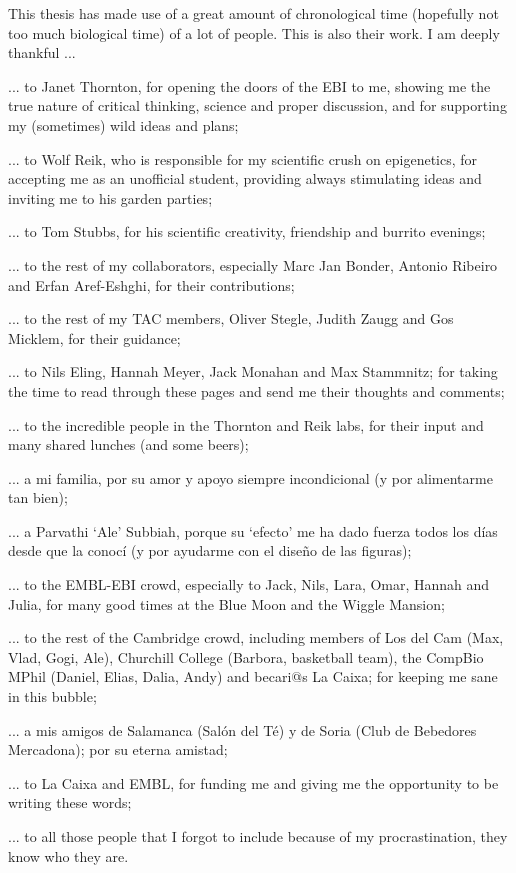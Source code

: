 
\begin{acknowledgements}      

\small
This thesis has made use of a great amount of chronological time (hopefully not too much biological time) of a lot of people. This is also their work. I am deeply thankful ...

\smallskip

... to Janet Thornton, for opening the doors of the EBI to me, showing me the true nature of critical thinking, science and proper discussion, and for supporting my (sometimes) wild ideas and plans;  

... to Wolf Reik, who is responsible for my scientific crush on epigenetics, for accepting me as an unofficial student, providing always stimulating ideas and inviting me to his garden parties;

... to Tom Stubbs, for his scientific creativity, friendship and burrito evenings;

... to the rest of my collaborators, especially Marc Jan Bonder, Antonio Ribeiro and Erfan Aref-Eshghi, for their contributions;

... to the rest of my TAC members, Oliver Stegle, Judith Zaugg and Gos Micklem, for their guidance;

... to Nils Eling, Hannah Meyer, Jack Monahan and Max Stammnitz; for taking the time to read through these pages and send me their thoughts and comments;

... to the incredible people in the Thornton and Reik labs, for their input and many shared lunches (and some beers);

... a mi familia, por su amor y apoyo siempre incondicional (y por alimentarme tan bien);

... a Parvathi `Ale' Subbiah, porque su `efecto' me ha dado fuerza todos los días desde que la conocí (y por ayudarme con el diseño de las figuras);

... to the EMBL-EBI crowd, especially to Jack, Nils, Lara, Omar, Hannah and Julia, for many good times at the Blue Moon and the Wiggle Mansion;

... to the rest of the Cambridge crowd, including members of Los del Cam (Max, Vlad, Gogi, Ale), Churchill College (Barbora, basketball team), the CompBio MPhil (Daniel, Elias, Dalia, Andy) and becari@s La Caixa; for keeping me sane in this bubble;

... a mis amigos de Salamanca (Salón del Té) y de Soria (Club de Bebedores Mercadona); por su eterna amistad;

... to La Caixa and EMBL, for funding me and giving me the opportunity to be writing these words;

... to all those people that I forgot to include because of my procrastination, they know who they are. 

\normalsize

\end{acknowledgements}
